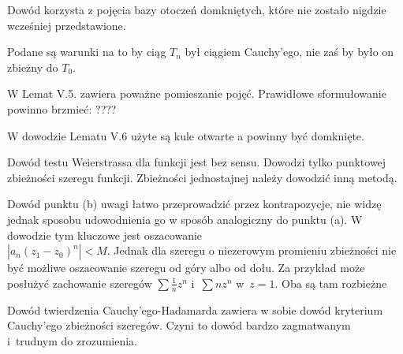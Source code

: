 \documentclass[a4paper,11pt]{article}
\begin{document}
\vspace{\spaceFour}



\start {} Dowód korzysta z pojęcia bazy otoczeń domkniętych,
które nie zostało nigdzie wcześniej przedstawione.

\vspace{\spaceFour}



\start {} Podane są warunki na to by ciąg $T_{ n }$ był ciągiem
Cauchy’ego, nie zaś by było on zbieżny do $T_{ 0 }$.

\vspace{\spaceFour}



\start {} W Lemat V.5. zawiera poważne pomieszanie pojęć.
Prawidłowe sformułowanie powinno brzmieć: ????

\vspace{\spaceFour}



\start {} W dowodzie Lematu V.6 użyte są kule otwarte a powinny
być domknięte.

\vspace{\spaceFour}



\start {} Dowód testu Weierstrassa dla funkcji jest bez sensu.
Dowodzi tylko punktowej zbieżności szeregu funkcji. Zbieżności
jednostajnej należy dowodzić inną metodą.

\vspace{\spaceFour}



\start {} Dowód punktu (b) uwagi łatwo przeprowadzić przez
kontrapozycje, nie widzę jednak sposobu udowodnienia go w sposób
analogiczny do punktu (a). W dowodzie tym kluczowe jest oszacowanie \\
$| a_{ n } ( z_{ 1 } - z_{ 0 } )^{ n } | < M$. Jednak dla szeregu o niezerowym
promieniu zbieżności nie być możliwe oszacowanie szeregu od góry albo
od dołu. Za przykład może posłużyć zachowanie szeregów
$\sum \frac{ 1 }{ n } z^{ n }$ i~$\sum n z^{ n }$ w~$z = 1$. Oba są tam
rozbieżne

\vspace{\spaceFour}



\start {} Dowód twierdzenia Cauchy’ego-Hadamarda zawiera w sobie
dowód kryterium Cauchy’ego zbieżności szeregów. Czyni to dowód bardzo
zagmatwanym i~trudnym do zrozumienia.
\end{document}
